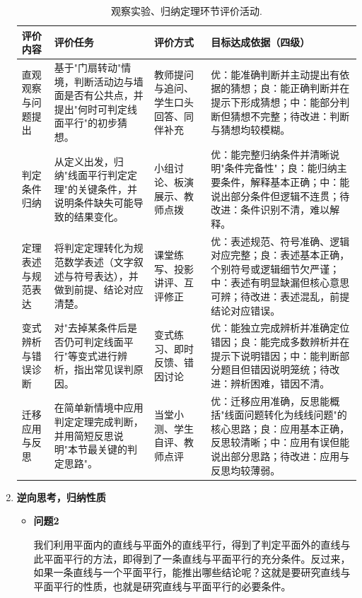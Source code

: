 \documentclass[UTF8,a4paper,12pt,twoside]{ctexart}
\begin{document}
\begin{enumerate}
\renewcommand\arraystretch{1.5}
\begin{longtable}{|>{\centering\arraybackslash}p{}|>{\centering\arraybackslash}p{}|>{\centering\arraybackslash}p{}|>{\centering\arraybackslash}p{}|}
\caption{\label{tab4.2}观察实验、归纳定理环节评价活动.} \\
\hline
评价内容 & 评价任务 & 评价方式 & 目标达成依据（四级）\\
\hline
直观观察与问题提出 & 基于"门扇转动"情境，判断活动边与墙面是否有公共点，并提出"何时可判定线面平行"的初步猜想。 & 教师提问与追问、学生口头回答、同伴补充 & 优：能准确判断并主动提出有依据的猜想；良：能正确判断并在提示下形成猜想；中：能部分判断但猜想不完整；待改进：判断与猜想均较模糊。 \\
\hline
判定条件归纳 & 从定义出发，归纳"线面平行判定定理"的关键条件，并说明条件缺失可能导致的结果变化。 & 小组讨论、板演展示、教师点拨 & 优：能完整归纳条件并清晰说明"条件完备性"；良：能归纳主要条件，解释基本正确；中：能说出部分条件但逻辑不连贯；待改进：条件识别不清，难以解释。 \\
\hline
定理表述与规范表达 & 将判定定理转化为规范数学表述（文字叙述与符号表达），并做到前提、结论对应清楚。 & 课堂练写、投影讲评、互评修正 & 优：表述规范、符号准确、逻辑对应完整；良：表述基本正确，个别符号或逻辑细节欠严谨；中：表述有明显缺漏但核心意思可辨；待改进：表述混乱，前提结论对应错误。 \\
\hline
变式辨析与错误诊断 & 对"去掉某条件后是否仍可判定线面平行"等变式进行辨析，指出常见误判原因。 & 变式练习、即时反馈、错因讨论 & 优：能独立完成辨析并准确定位错因；良：能完成多数辨析并在提示下说明错因；中：能判断部分题目但错因说明笼统；待改进：辨析困难，错因不清。 \\
\hline
迁移应用与反思 & 在简单新情境中应用判定定理完成判断，并用简短反思说明"本节最关键的判定思路"。 & 当堂小测、学生自评、教师点评 & 优：迁移应用准确，反思能概括"线面问题转化为线线问题"的核心思路；良：应用基本正确，反思较清晰；中：应用有误但能说出部分思路；待改进：应用与反思均较薄弱。 \\
\hline
\end{longtable}


    \item \textbf{逆向思考，归纳性质}

\begin{itemize}
    \item \textbf{问题2}

我们利用平面内的直线与平面外的直线平行，得到了判定平面外的直线与此平面平行的方法，即得到了一条直线与平面平行的充分条件。反过来，如果一条直线与一个平面平行，能推出哪些结论呢？这就是要研究直线与平面平行的性质，也就是研究直线与平面平行的必要条件。


\end{itemize}
\end{enumerate}
\end{document}
